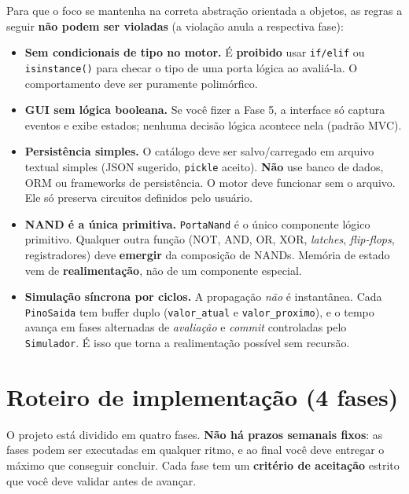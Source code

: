 \documentclass[11pt,a4paper]{article}
\begin{document}
\begin{rulebox}
\vspace{2pt}
Para que o foco se mantenha na correta abstração orientada a objetos, as regras a seguir \textbf{não podem ser violadas} (a violação anula a respectiva fase):
\begin{itemize}
    \item \textbf{Sem condicionais de tipo no motor.} É \textbf{proibido} usar \texttt{if/elif} ou \texttt{isinstance()} para checar o tipo de uma porta lógica ao avaliá-la. O comportamento deve ser puramente polimórfico.
    \item \textbf{GUI sem lógica booleana.} Se você fizer a Fase 5, a interface só captura eventos e exibe estados; nenhuma decisão lógica acontece nela (padrão MVC).
    \item \textbf{Persistência simples.} O catálogo deve ser salvo/carregado em arquivo textual simples (JSON sugerido, \texttt{pickle} aceito). \textbf{Não} use banco de dados, ORM ou frameworks de persistência. O motor deve funcionar sem o arquivo. Ele só preserva circuitos definidos pelo usuário.
    \item \textbf{NAND é a única primitiva.} \texttt{PortaNand} é o único componente lógico primitivo. Qualquer outra função (NOT, AND, OR, XOR, \textit{latches}, \textit{flip-flops}, registradores) deve \textbf{emergir} da composição de NANDs. Memória de estado vem de \textbf{realimentação}, não de um componente especial.
    \item \textbf{Simulação síncrona por ciclos.} A propagação \emph{não} é instantânea. Cada \texttt{PinoSaida} tem buffer duplo (\texttt{valor\_atual} e \texttt{valor\_proximo}), e o tempo avança em fases alternadas de \emph{avaliação} e \emph{commit} controladas pelo \texttt{Simulador}. É isso que torna a realimentação possível sem recursão.
\end{itemize}
\end{rulebox}

\newpage

\section*{Roteiro de implementação (4 fases)}
O projeto está dividido em quatro fases. \textbf{Não há prazos semanais fixos}: as fases podem ser executadas em qualquer ritmo, e ao final você deve entregar o máximo que conseguir concluir. Cada fase tem um \textbf{critério de aceitação} estrito que você deve validar antes de avançar.
\end{document}
